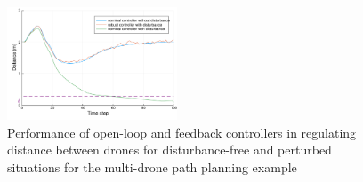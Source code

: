 \begin{figure}[t]
	\centering
	\includegraphics[width=0.45\textwidth]{figures/dist_path_planning.pdf}
	\caption{Performance of open-loop and feedback controllers in regulating distance between drones for disturbance-free and perturbed situations for the multi-drone path planning example}
	\label{fig:multi_drone_distance}
\end{figure}


